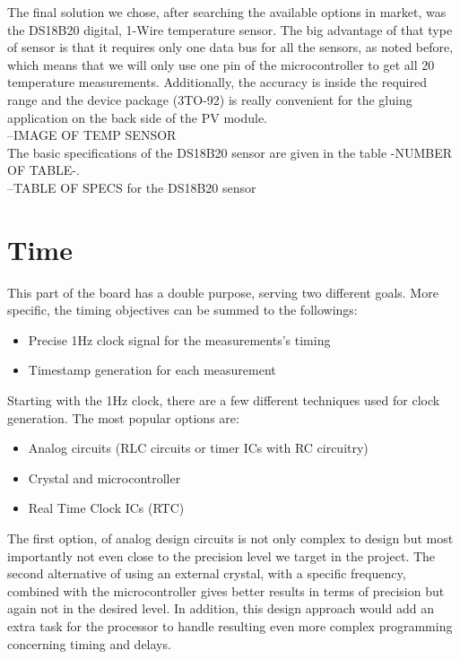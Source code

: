The final solution we chose, after searching the available options in market, was the DS18B20 digital, 1-Wire temperature sensor. The big advantage of that type of sensor is that it requires only one data bus for all the sensors, as noted before, which means that we will only use one pin of the microcontroller to get all 20 temperature measurements. Additionally, the accuracy is inside the required range and the device package (3TO-92) is really convenient for the gluing application on the back side of the PV module.\\

--IMAGE OF TEMP SENSOR\\

The basic specifications of the DS18B20 sensor are given in the table -NUMBER OF TABLE-.\\

--TABLE OF SPECS for the DS18B20 sensor\\


\section{Time}
This part of the board has a double purpose, serving two different goals. More specific, the timing objectives can be summed to the followings:

\begin{itemize}
    \item Precise 1Hz clock signal for the measurements's timing
    \item Timestamp generation for each measurement
\end{itemize}

Starting with the 1Hz clock, there are a few different techniques used for clock generation. The most popular options are:

\begin{itemize}
    \item Analog circuits (RLC circuits or timer ICs with RC circuitry)
    \item Crystal and microcontroller
    \item Real Time Clock ICs (RTC)
\end{itemize}

The first option, of analog design circuits is not only complex to design but most importantly not even close to the precision level we target in the project. The second alternative of using an external crystal, with a specific frequency, combined with the microcontroller gives better results in terms of precision but again not in the desired level. In addition, this design approach would add an extra task for the processor to handle resulting even more complex programming concerning timing and delays.

